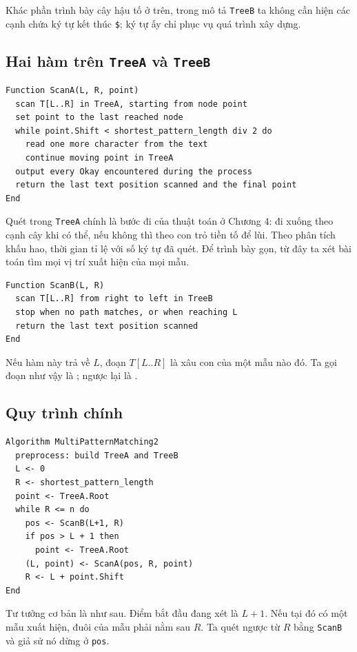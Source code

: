 \documentclass[11pt]{article}
\begin{document}
Khác phần trình bày cây hậu tố ở trên, trong mô tả \texttt{TreeB} ta không cần
hiện các cạnh chứa ký tự kết thúc \texttt{\$}; ký tự ấy chỉ phục vụ quá trình
xây dựng.

\subsection{Hai hàm trên \texttt{TreeA} và \texttt{TreeB}}

\begin{verbatim}
Function ScanA(L, R, point)
  scan T[L..R] in TreeA, starting from node point
  set point to the last reached node
  while point.Shift < shortest_pattern_length div 2 do
    read one more character from the text
    continue moving point in TreeA
  output every Okay encountered during the process
  return the last text position scanned and the final point
End
\end{verbatim}

Quét trong \texttt{TreeA} chính là bước đi của thuật toán ở Chương 4: đi xuống
theo cạnh cây khi có thể, nếu không thì theo con trỏ tiền tố để lùi. Theo phân
tích khấu hao, thời gian tỉ lệ với số ký tự đã quét. Để trình bày gọn, từ đây
ta xét bài toán tìm mọi vị trí xuất hiện của mọi mẫu.

\begin{verbatim}
Function ScanB(L, R)
  scan T[L..R] from right to left in TreeB
  stop when no path matches, or when reaching L
  return the last text position scanned
End
\end{verbatim}

Nếu hàm này trả về $L$, đoạn $T[L..R]$ là xâu con của một mẫu nào đó. Ta gọi
đoạn như vậy là ; ngược lại là .

\subsection{Quy trình chính}

\begin{verbatim}
Algorithm MultiPatternMatching2
  preprocess: build TreeA and TreeB
  L <- 0
  R <- shortest_pattern_length
  point <- TreeA.Root
  while R <= n do
    pos <- ScanB(L+1, R)
    if pos > L + 1 then
      point <- TreeA.Root
    (L, point) <- ScanA(pos, R, point)
    R <- L + point.Shift
End
\end{verbatim}

Tư tưởng cơ bản là như sau. Điểm bắt đầu đang xét là $L+1$. Nếu tại đó có một
mẫu xuất hiện, đuôi của mẫu phải nằm sau $R$. Ta quét ngược từ $R$ bằng
\texttt{ScanB} và giả sử nó dừng ở \texttt{pos}.
\end{document}
